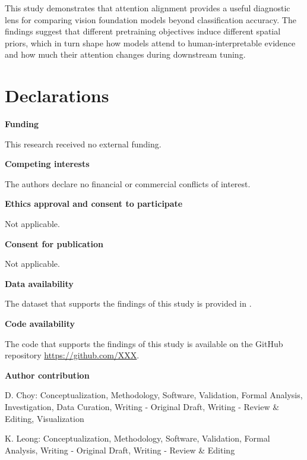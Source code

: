 \documentclass[lineno,pdflatex,sn-mathphys-num]{sn-jnl}%
\theoremstyle{thmstyleone}%
\theoremstyle{thmstyletwo}%
\theoremstyle{thmstylethree}%
\begin{document}
This study demonstrates that attention alignment provides a useful diagnostic lens for comparing vision foundation models beyond classification accuracy. The findings suggest that different pretraining objectives induce different spatial priors, which in turn shape how models attend to human-interpretable evidence and how much their attention changes during downstream tuning. 

\backmatter


\section*{Declarations}

\textbf{Funding}

This research received no external funding. \newline

\noindent\textbf{Competing interests}

The authors declare no financial or commercial conflicts of interest. \newline

\noindent\textbf{Ethics approval and consent to participate}

Not applicable.\newline

\noindent\textbf{Consent for publication}

Not applicable.\newline

\noindent\textbf{Data availability }

The dataset that supports the findings of this study is provided in \cite{Barz21WikiChurches}.\newline

\noindent\textbf{Code availability }

The code that supports the findings of this study is available on the GitHub repository \url{https://github.com/XXX}.\newline

\noindent\textbf{Author contribution}


D. Choy: Conceptualization, Methodology, Software, Validation, Formal Analysis, Investigation, Data Curation, Writing - Original Draft, Writing - Review \& Editing, Visualization

K. Leong: Conceptualization, Methodology, Software, Validation, Formal Analysis, Writing - Original Draft, Writing - Review \& Editing
\end{document}
